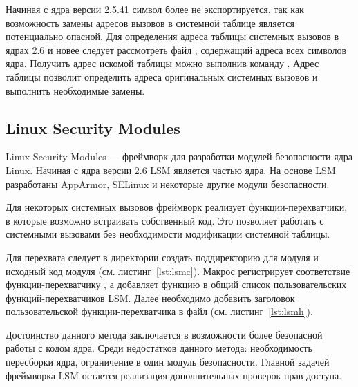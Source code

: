 

Начиная с ядра версии 2.5.41 символ  более не экспортируется, так как возможность замены адресов вызовов в системной таблице является потенциально опасной.
Для определения адреса таблицы системных вызовов в ядрах 2.6 и новее следует рассмотреть файл , содержащий адреса всех символов ядра. Получить адрес искомой таблицы можно выполнив команду . Адрес таблицы позволит определить адреса оригинальных системных вызовов и выполнить необходимые замены.

\subsection{Linux Security Modules}

Linux Security Modules --- фреймворк для разработки модулей безопасности ядра Linux. Начиная с ядра версии 2.6 LSM является частью ядра. На основе LSM разработаны AppArmor, SELinux и некоторые другие модули безопасности.

Для некоторых системных вызовов фреймворк реализует функции-перехватчики, в которые возможно встраивать собственный код. Это позволяет работать с системными вызовами без необходимости модификации системной таблицы.

Для перехвата  следует в директории  создать поддиректорию для модуля и исходный код модуля (см. листинг~\ref{lst:lsmc}). Макрос  регистрирует соответствие  функции-перехватчику , а  добавляет функцию в общий список пользовательских функций-перехватчиков LSM. Далее необходимо добавить заголовок пользовательской функции-перехватчика в файл  (см. листинг~\ref{lst:lsmh}).





Достоинство данного метода заключается в возможности более безопасной работы с кодом ядра. Среди недостатков данного метода: необходимость пересборки ядра, ограничение в один модуль безопасности. Главной задачей фреймворка LSM остается реализация дополнительных проверок прав доступа.

